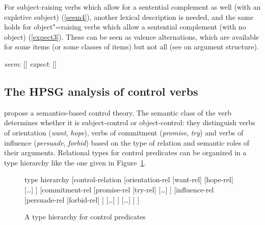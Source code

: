 \eal
{}
\zl

For subject-raising verbs which allow for a sentential complement as well (with an expletive
subject) (\ref{seem4}), another lexical description is needed, and the same holds for
object"=raising verbs which allow a sentential complement (with no object) (\ref{expect3}). These
can be seen as valence alternations, which are available for some items (or some classes of items)
but not all (see  on argument structure). 

\eal
\ex \emph{seem}:   [\argst {}]
\ex \emph{expect}: [\argst {}]
\zl

\subsection{The HPSG analysis of control verbs}

\citet{SagandPollard1991} propose a semantics-based control theory. The semantic class of the verb
determines whether it is subject-control or object-control: they distinguish verbs of orientation
(\emph{want}, \emph{hope}), verbs of commitment (\emph{promise}, \emph{try}) and verbs of influence
(\emph{persuade}, \emph{forbid}) based on the type of relation and semantic roles of their
arguments. Relational types for control predicates can be organized in a type hierarchy like the one
given in Figure~\ref{verb-hier3}.

\begin{figure}
	\begin{forest}type hierarchy
       [control-relation
      					[orientation-rel
      						[want-rel] 
      						 [hope-rel]
      						 [\ldots]   		
      					] 
      					[commitment-rel
      					 		[promise-rel
      					 			[try-rel]
      					 		[\ldots]
      					 	]
      					 	 [influence-rel
      					 		[persuade-rel
      					 			[forbid-rel]
      					 		]
      					 		[\ldots]
      					 	]
      					 	[\ldots]
      					]  
      	]
\end{forest}
\caption{\label{verb-hier3}A type hierarchy for control predicates}
\end{figure}

